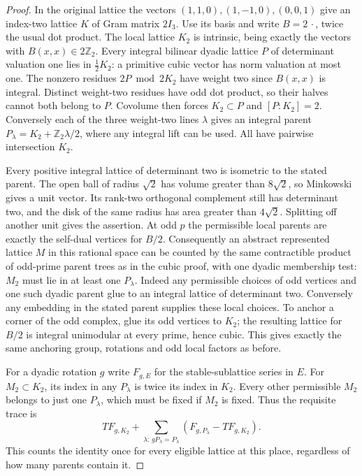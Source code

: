 \begin{proof}
In the original lattice the vectors $(1,1,0),(1,-1,0),(0,0,1)$
give an index-two lattice $K$ of Gram matrix $2I_3$. Use its basis
and write $B=2\,\cdot$, twice the usual dot product. The local lattice
$K_2$ is intrinsic, being exactly the vectors with $B(x,x)\in2\mathbb Z_2$.
Every integral bilinear dyadic lattice $P$ of determinant valuation
one lies in $\frac12K_2$: a primitive cubic vector has norm valuation
at most one. The nonzero residues $2P\bmod 2K_2$ have weight two
since $B(x,x)$ is integral. Distinct weight-two residues have odd dot
product, so their halves cannot both belong to $P$. Covolume then
forces $K_2\subset P$ and $[P:K_2]=2$. Conversely each of the three
weight-two lines $\lambda$ gives an integral parent
$P_\lambda=K_2+\mathbb Z_2\lambda/2$, where any integral lift can be used.
All have pairwise intersection $K_2$.

Every positive integral lattice of determinant two is isometric to
the stated parent. The open ball of radius $\sqrt2$ has volume greater
than $8\sqrt2$, so Minkowski gives a unit vector. Its rank-two
orthogonal complement still has determinant two, and the disk of the
same radius has area greater than $4\sqrt2$. Splitting off another
unit gives the assertion. At odd $p$ the permissible local parents
are exactly the self-dual vertices for $B/2$. Consequently an abstract
represented lattice $M$ in this rational space can be counted by the
same contractible product of odd-prime parent trees as in the cubic
proof, with one dyadic membership test: $M_2$ must lie in at least
one $P_\lambda$. Indeed any permissible choices of odd vertices and
one such dyadic parent glue to an integral lattice of determinant
two. Conversely any embedding in the stated parent supplies these
local choices. To anchor a corner of the odd complex, glue its odd
vertices to $K_2$; the resulting lattice for $B/2$ is integral
unimodular at every prime, hence cubic. This gives exactly the same
anchoring group, rotations and odd local factors as before.

For a dyadic rotation $g$ write $F_{g,E}$ for the stable-sublattice
series in $E$. For $M_2\subset K_2$, its index in any $P_\lambda$
is twice its index in $K_2$. Every other permissible $M_2$ belongs
to just one $P_\lambda$, which must be fixed if $M_2$ is fixed.
Thus the requisite trace is
\[
 T F_{g,K_2}+
 \sum_{\lambda:\,gP_\lambda=P_\lambda}
       (F_{g,P_\lambda}-T F_{g,K_2}).
\]
This counts the identity once for every eligible lattice at this place,
regardless of how many parents contain it.


\end{proof}
